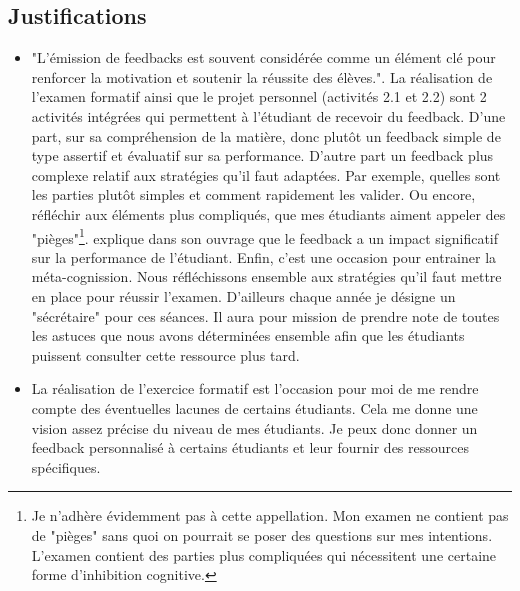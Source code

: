 \subsection{Justifications}
\label{evaluation_des_apprentissages_justifications}
\begin{itemize}
    \item "L’émission de feedbacks est souvent considérée comme un élément clé pour renforcer la motivation et soutenir la réussite des élèves."\cite{georges2011feedbacks}. La réalisation de l'examen formatif ainsi que le projet personnel (activités 2.1 et 2.2) sont 2 activités intégrées qui permettent à l’étudiant de recevoir du feedback. D'une part, sur sa compréhension de la matière, donc plutôt un feedback simple de type assertif et évaluatif \cite{georges2011feedbacks} sur sa performance. D'autre part un feedback plus complexe relatif aux stratégies qu'il faut adaptées. Par exemple, quelles sont les parties plutôt simples et comment rapidement les valider. Ou encore, réfléchir aux éléments plus compliqués, que mes étudiants aiment appeler des "pièges"\footnote{Je n'adhère évidemment pas à cette appellation. Mon examen ne contient pas de "pièges" sans quoi on pourrait se poser des questions sur mes intentions. L'examen contient des parties plus compliquées qui nécessitent une certaine forme d'inhibition cognitive.}. \citep{hattie2008visible} explique dans son ouvrage que le feedback a un impact significatif sur la performance de l'étudiant. Enfin, c'est une occasion pour entrainer la méta-cognission\cite{leclercq2008modele}. Nous réfléchissons ensemble aux stratégies qu'il faut mettre en place pour réussir l'examen. D'ailleurs chaque année je désigne un "sécrétaire" pour ces séances. Il aura pour mission de prendre note de toutes les astuces que nous avons déterminées ensemble afin que les étudiants puissent consulter cette ressource plus tard.
    \item La réalisation de l'exercice formatif est l'occasion pour moi de me rendre compte des éventuelles lacunes de certains étudiants. Cela me donne une vision assez précise du niveau de mes étudiants. Je peux donc donner un feedback personnalisé à certains étudiants et leur fournir des ressources spécifiques.

\end{itemize}
